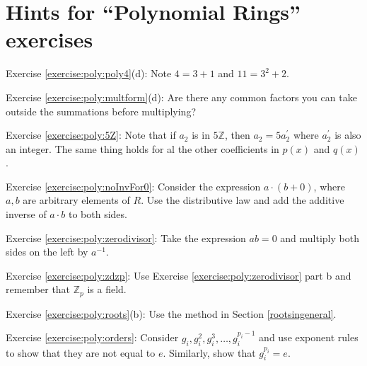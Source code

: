 \section{Hints for ``Polynomial Rings'' exercises}\label{sec:polyrings:hints} 

\noindent Exercise \ref{exercise:poly:poly4}(d):  Note $4=3+1$ and $11=3^2+2$.

\noindent Exercise \ref{exercise:poly:multform}(d): Are there any common factors you can take outside 
the summations before multiplying?

\noindent Exercise \ref{exercise:poly:5Z}:  Note that if  $a_2$ is in $5\mathbb{Z}$, then $a_2 = 5a_2^{\prime}$ where $a_2^{\prime}$ is also an integer.
The same thing holds for al the other coefficients in $p(x)$ and $q(x)$.

\noindent Exercise \ref{exercise:poly:noInvFor0}:  Consider the expression $a\cdot (b + 0)$, where $a,b$ are arbitrary elements of $R$. Use the distributive law and add the additive inverse of  $a \cdot b$ to both sides.

\noindent Exercise \ref{exercise:poly:zerodivisor}:  Take the expression $ab=0$ and multiply both sides on the left by $a^{-1}$.

\noindent Exercise \ref{exercise:poly:zdzp}:  Use Exercise \ref{exercise:poly:zerodivisor} part b and remember that $\mathbb{Z}_p$ is a field.

\noindent Exercise \ref{exercise:poly:roots}(b):  Use the method in Section \ref{rootsingeneral}.

\noindent Exercise \ref{exercise:poly:orders}:  Consider $g_i, g_i^2, g_i^3, \ldots, g_i^{p_i-1}$ and use exponent rules to show that they are not equal to $e$.  Similarly, show that $g_i^{p_i} = e$.
 